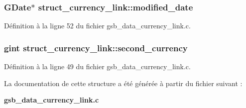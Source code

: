 \subsubsection[{modified\_\-date}]{\setlength{\rightskip}{0pt plus 5cm}GDate$\ast$ {\bf struct\_\-currency\_\-link::modified\_\-date}}\label{structstruct__currency__link_ac50cdd48ba1a55f1c83b120a65303091}


Définition à la ligne 52 du fichier gsb\_\-data\_\-currency\_\-link.c.

\subsubsection[{second\_\-currency}]{\setlength{\rightskip}{0pt plus 5cm}gint {\bf struct\_\-currency\_\-link::second\_\-currency}}\label{structstruct__currency__link_aa651b7e6de5b490f5963d945a7be8e73}


Définition à la ligne 49 du fichier gsb\_\-data\_\-currency\_\-link.c.



La documentation de cette structure a été générée à partir du fichier suivant :\begin{DoxyCompactItemize}
\item 
{\bf gsb\_\-data\_\-currency\_\-link.c}\end{DoxyCompactItemize}
